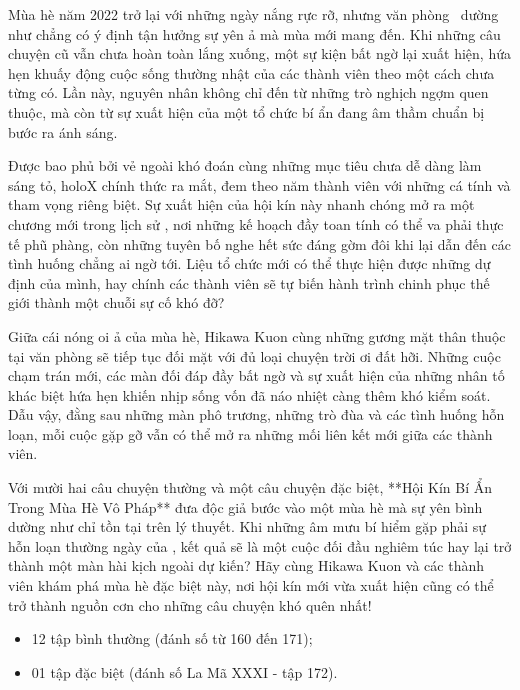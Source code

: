 \documentclass[main.tex]{subfiles}
\begin{document}
Mùa hè năm 2022 trở lại với những ngày nắng rực rỡ, nhưng văn phòng \hll\ dường như chẳng có ý định tận hưởng sự yên ả mà mùa mới mang đến. Khi những câu chuyện cũ vẫn chưa hoàn toàn lắng xuống, một sự kiện bất ngờ lại xuất hiện, hứa hẹn khuấy động cuộc sống thường nhật của các thành viên theo một cách chưa từng có. Lần này, nguyên nhân không chỉ đến từ những trò nghịch ngợm quen thuộc, mà còn từ sự xuất hiện của một tổ chức bí ẩn đang âm thầm chuẩn bị bước ra ánh sáng.

Được bao phủ bởi vẻ ngoài khó đoán cùng những mục tiêu chưa dễ dàng làm sáng tỏ, holoX chính thức ra mắt, đem theo năm thành viên với những cá tính và tham vọng riêng biệt. Sự xuất hiện của hội kín này nhanh chóng mở ra một chương mới trong lịch sử \hll, nơi những kế hoạch đầy toan tính có thể va phải thực tế phũ phàng, còn những tuyên bố nghe hết sức đáng gờm đôi khi lại dẫn đến các tình huống chẳng ai ngờ tới. Liệu tổ chức mới có thể thực hiện được những dự định của mình, hay chính các thành viên sẽ tự biến hành trình chinh phục thế giới thành một chuỗi sự cố khó đỡ?

Giữa cái nóng oi ả của mùa hè, Hikawa Kuon cùng những gương mặt thân thuộc tại văn phòng sẽ tiếp tục đối mặt với đủ loại chuyện trời ơi đất hỡi. Những cuộc chạm trán mới, các màn đối đáp đầy bất ngờ và sự xuất hiện của những nhân tố khác biệt hứa hẹn khiến nhịp sống vốn đã náo nhiệt càng thêm khó kiểm soát. Dẫu vậy, đằng sau những màn phô trương, những trò đùa và các tình huống hỗn loạn, mỗi cuộc gặp gỡ vẫn có thể mở ra những mối liên kết mới giữa các thành viên.

Với mười hai câu chuyện thường và một câu chuyện đặc biệt, **Hội Kín Bí Ẩn Trong Mùa Hè Vô Pháp** đưa độc giả bước vào một mùa hè mà sự yên bình dường như chỉ tồn tại trên lý thuyết. Khi những âm mưu bí hiểm gặp phải sự hỗn loạn thường ngày của \hll, kết quả sẽ là một cuộc đối đầu nghiêm túc hay lại trở thành một màn hài kịch ngoài dự kiến? Hãy cùng Hikawa Kuon và các thành viên khám phá mùa hè đặc biệt này, nơi hội kín mới vừa xuất hiện cũng có thể trở thành nguồn cơn cho những câu chuyện khó quên nhất!

{}
\begin{itemize}
  \item 12 tập bình thường (đánh số từ 160 đến 171);
  \item 01 tập đặc biệt (đánh số La Mã XXXI - tập 172).
\end{itemize}
\end{document}
